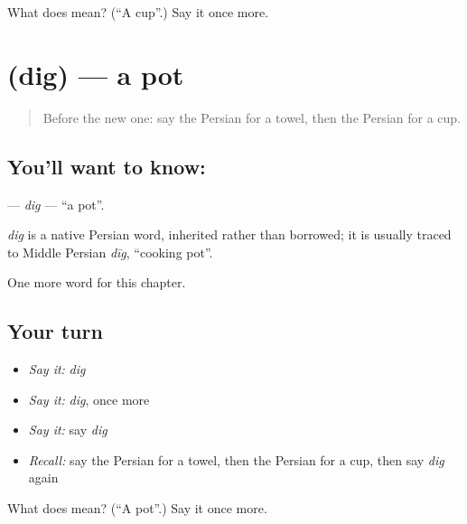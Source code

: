 \begin{tcolorbox}[breakable,colback=teal!4,colframe=teal!35!black,title={Before you move on}]
What does  mean? (\textquotedblleft{}A cup\textquotedblright{}.) Say it once more.
\end{tcolorbox}
\section[\texorpdfstring{\fa{دیگ} (dig)}{دیگ (dig)}]{ (dig) — a pot}

\label{lesson:FA-C95-dig}



\begin{quote}
Before the new one: say the Persian for a towel, then the Persian for a cup.
\end{quote}

\subsection*{You'll want to know: }
\textbf{} — \emph{dig} — \textquotedblleft{}a pot\textquotedblright{}.

\begin{cousinweb}
\emph{dig} is a native Persian word, inherited rather than borrowed; it is usually traced to Middle Persian \emph{dīg}, \textquotedblleft{}cooking pot\textquotedblright{}.
\end{cousinweb}

\begin{grammarlens}[title={What you've built}]
One more word for this chapter.
\end{grammarlens}

\subsection*{Your turn}
\begin{itemize}
\raggedright
  \item \emph{Say it:} \emph{dig}
  \item \emph{Say it:} \emph{dig}, once more
  \item \emph{Say it:} say \emph{dig}
  \item \emph{Recall:} say the Persian for a towel, then the Persian for a cup, then say \emph{dig} again
\end{itemize}

\begin{tcolorbox}[breakable,colback=teal!4,colframe=teal!35!black,title={Before you move on}]
What does  mean? (\textquotedblleft{}A pot\textquotedblright{}.) Say it once more.
\end{tcolorbox}
